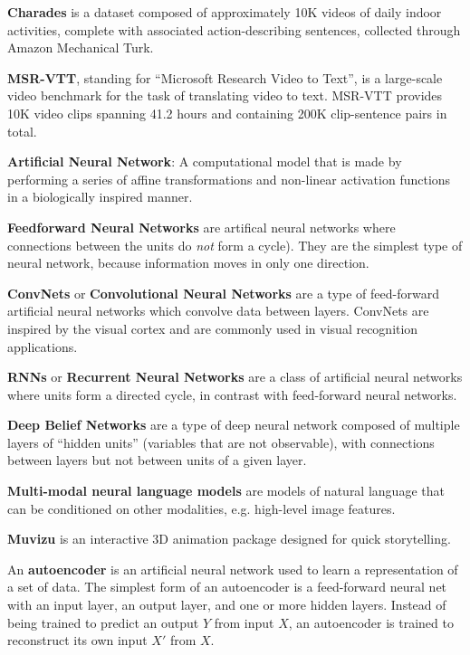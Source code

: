 \documentclass{scrreprt}
\begin{document}
\textbf{Charades} is a dataset composed of approximately 10K videos of daily
indoor activities, complete with associated action-describing sentences,
collected through Amazon Mechanical Turk\cite{charades}.

\textbf{MSR-VTT}, standing for ``Microsoft Research Video to Text'', is a
large-scale video benchmark for the task of translating video to text. MSR-VTT
provides 10K video clips spanning 41.2 hours and containing 200K clip-sentence
pairs in total\cite{msr-vtt}.

\textbf{Artificial Neural Network}: A computational model that is made by performing a series of affine transformations
and non-linear activation functions in a biologically inspired manner.

\textbf{Feedforward Neural Networks} are artifical neural networks where
connections between the units do \textit{not} form a cycle). They are the
simplest type of neural network, because information moves in only one
direction.

\textbf{ConvNets} or \textbf{Convolutional Neural Networks} are a type of
feed-forward artificial neural networks which convolve data between layers. ConvNets are inspired by the visual
cortex and are commonly used in visual recognition applications.

\textbf{RNNs} or \textbf{Recurrent Neural Networks} are a class of artificial
neural networks where units form a directed cycle, in contrast with
feed-forward neural networks.

\textbf{Deep Belief Networks} are a type of deep neural network composed of
multiple layers of ``hidden units'' (variables that are not observable), with
connections between layers but not between units of a given layer.

\textbf{Multi-modal neural language models} are models of natural language that
can be conditioned on other modalities, e.g. high-level image
features\cite{DBLP:journals/corr/KirosSZ14}.

\textbf{Muvizu} is an interactive 3D animation package designed for quick storytelling.

An \textbf{autoencoder} is an artificial neural network used to learn a
representation of a set of data. The simplest form of an autoencoder is a
feed-forward neural net with an input layer, an output layer, and one or more
hidden layers. Instead of being trained to predict an output $Y$ from input
$X$, an autoencoder is trained to reconstruct its own input $X'$ from $X$.
\end{document}
